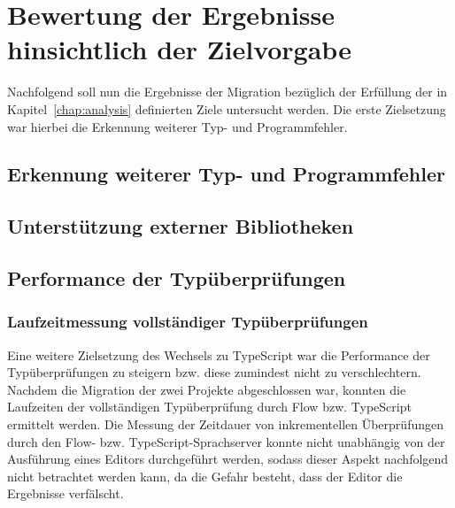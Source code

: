 \section{Bewertung der Ergebnisse hinsichtlich der Zielvorgabe}

Nachfolgend soll nun die Ergebnisse der Migration bezüglich der Erfüllung der in Kapitel~\ref{chap:analysis} definierten Ziele untersucht werden. Die erste Zielsetzung war hierbei die Erkennung weiterer Typ- und Programmfehler.

\subsection{Erkennung weiterer Typ- und Programmfehler}
\label{goal:new-type-errors}




\subsection{Unterstützung externer Bibliotheken}


\subsection{Performance der Typüberprüfungen}

\subsubsection{Laufzeitmessung vollständiger Typüberprüfungen}

Eine weitere Zielsetzung des Wechsels zu TypeScript war die Performance der Typüberprüfungen zu steigern bzw. diese zumindest nicht zu verschlechtern. Nachdem die Migration der zwei Projekte abgeschlossen war, konnten die Laufzeiten der vollständigen Typüberprüfung durch Flow bzw. TypeScript ermittelt werden. Die Messung der Zeitdauer von inkrementellen Überprüfungen durch den Flow- bzw. TypeScript-Sprachserver konnte nicht unabhängig von der Ausführung eines Editors  durchgeführt werden, sodass dieser Aspekt nachfolgend nicht betrachtet werden kann, da die Gefahr besteht, dass der Editor die Ergebnisse verfälscht.

